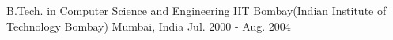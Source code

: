

\begin{cventries}

  \cventry
    {B.Tech. in Computer Science and Engineering} %
    {IIT Bombay(Indian Institute of Technology Bombay)} %
    {Mumbai, India} %
    {Jul. 2000 - Aug. 2004} %
    {}
\end{cventries}
